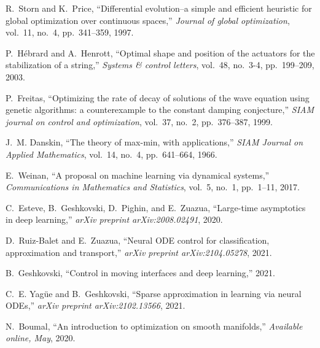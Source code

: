 \documentclass[journal,twoside,web]{ieeecolor}
\begin{document}
\begin{thebibliography}{10}
R.~Storn and K.~Price, ``Differential evolution--a simple and efficient
  heuristic for global optimization over continuous spaces,'' {\em Journal of
  global optimization}, vol.~11, no.~4, pp.~341--359, 1997.

P.~H{\'e}brard and A.~Henrott, ``Optimal shape and position of the actuators
  for the stabilization of a string,'' {\em Systems \& control letters},
  vol.~48, no.~3-4, pp.~199--209, 2003.

P.~Freitas, ``Optimizing the rate of decay of solutions of the wave equation
  using genetic algorithms: a counterexample to the constant damping
  conjecture,'' {\em SIAM journal on control and optimization}, vol.~37, no.~2,
  pp.~376--387, 1999.

J.~M. Danskin, ``The theory of max-min, with applications,'' {\em SIAM Journal
  on Applied Mathematics}, vol.~14, no.~4, pp.~641--664, 1966.

E.~Weinan, ``A proposal on machine learning via dynamical systems,'' {\em
  Communications in Mathematics and Statistics}, vol.~5, no.~1, pp.~1--11,
  2017.

C.~Esteve, B.~Geshkovski, D.~Pighin, and E.~Zuazua, ``Large-time asymptotics in
  deep learning,'' {\em arXiv preprint arXiv:2008.02491}, 2020.

D.~Ruiz-Balet and E.~Zuazua, ``Neural {ODE} control for classification,
  approximation and transport,'' {\em arXiv preprint arXiv:2104.05278}, 2021.

B.~Geshkovski, ``Control in moving interfaces and deep learning,'' 2021.

C.~E. Yag{\"u}e and B.~Geshkovski, ``Sparse approximation in learning via
  neural {ODE}s,'' {\em arXiv preprint arXiv:2102.13566}, 2021.

N.~Boumal, ``An introduction to optimization on smooth manifolds,'' {\em
  Available online, May}, 2020.

\end{thebibliography}
\end{document}
